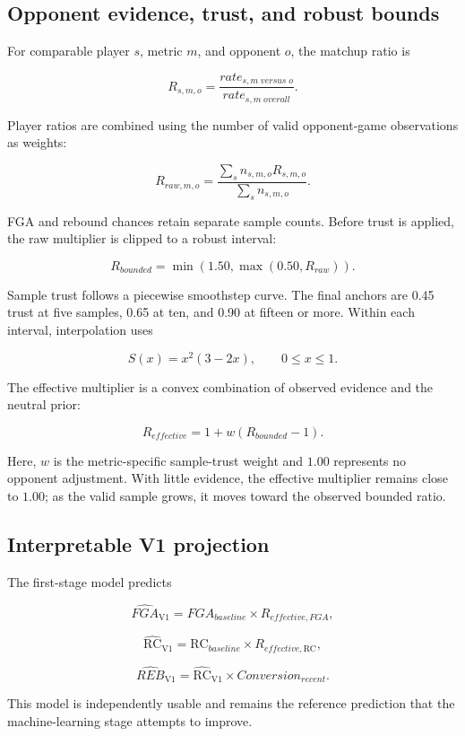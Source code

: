 \documentclass[11pt]{article}
\newcommand{\RC}{\mathrm{RC}}
\newcommand{\Vone}{\mathrm{V1}}
\begin{document}
\subsection{Opponent evidence, trust, and robust bounds}

For comparable player $s$, metric $m$, and opponent $o$, the matchup ratio is

\[
R_{s,m,o}=\frac{rate_{s,m\;versus\;o}}{rate_{s,m\;overall}}.
\]

Player ratios are combined using the number of valid opponent-game
observations as weights:

\[
R_{raw,m,o}=
\frac{\sum_s n_{s,m,o}R_{s,m,o}}
     {\sum_s n_{s,m,o}}.
\]

FGA and rebound chances retain separate sample counts. Before trust is
applied, the raw multiplier is clipped to a robust interval:

\[
R_{bounded}=\min(1.50,\max(0.50,R_{raw})).
\]

Sample trust follows a piecewise smoothstep curve. The final anchors are
0.45 trust at five samples, 0.65 at ten, and 0.90 at fifteen or more. Within
each interval, interpolation uses

\[
S(x)=x^2(3-2x), \qquad 0\leq x\leq1.
\]

The effective multiplier is a convex combination of observed evidence and the
neutral prior:

\[
R_{effective}=1+w(R_{bounded}-1).
\]

Here, $w$ is the metric-specific sample-trust weight and $1.00$ represents no
opponent adjustment. With little evidence, the effective multiplier remains
close to $1.00$; as the valid sample grows, it moves toward the observed
bounded ratio.

\subsection{Interpretable V1 projection}

The first-stage model predicts

\[
\widehat{FGA}_{\Vone}=FGA_{baseline}\times R_{effective,FGA},
\]

\[
\widehat{\RC}_{\Vone}=\RC_{baseline}\times R_{effective,\RC},
\]

\[
\widehat{REB}_{\Vone}=\widehat{\RC}_{\Vone}
\times Conversion_{recent}.
\]

This model is independently usable and remains the reference prediction that
the machine-learning stage attempts to improve.
\end{document}
